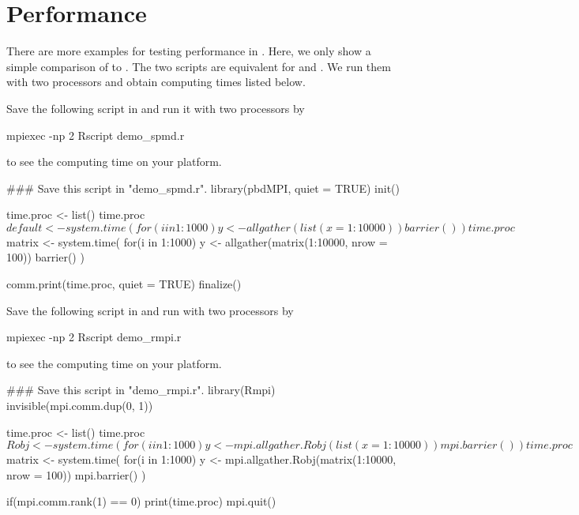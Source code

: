
\section[Performance]{Performance}
\label{sec:performance}

There are more examples for testing performance in
. Here, we only show a simple
comparison of  to .  The two scripts are
equivalent for  and .  We run them with two
processors and obtain computing times listed below.

Save the following script in  and run it with two
processors by
\begin{Command}
mpiexec -np 2 Rscript demo_spmd.r
\end{Command}
to see the computing time on your platform.

\begin{Code}[title=\pkg{pbdMPI} R Script]
### Save this script in "demo_spmd.r".
library(pbdMPI, quiet = TRUE)
init()

time.proc <- list()
time.proc$default <- system.time({
  for(i in 1:1000) y <- allgather(list(x = 1:10000))
  barrier()
})

time.proc$matrix <- system.time({
  for(i in 1:1000) y <- allgather(matrix(1:10000, nrow = 100))
  barrier()
})

comm.print(time.proc, quiet = TRUE)
finalize()
\end{Code}

Save the following script in  and run with two processors by
\begin{Command}
mpiexec -np 2 Rscript demo_rmpi.r
\end{Command}
to see the computing time on your platform.

\begin{Code}[title=\pkg{Rmpi} R Script]
### Save this script in "demo_rmpi.r".
library(Rmpi)
invisible(mpi.comm.dup(0, 1))

time.proc <- list()
time.proc$Robj <- system.time({
  for(i in 1:1000) y <- mpi.allgather.Robj(list(x = 1:10000))
  mpi.barrier()
})

time.proc$matrix <- system.time({
  for(i in 1:1000) y <- mpi.allgather.Robj(matrix(1:10000, nrow = 100))
  mpi.barrier()
})

if(mpi.comm.rank(1) == 0) print(time.proc)
mpi.quit()
\end{Code}

